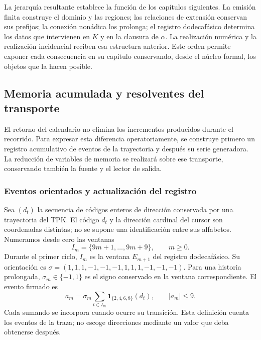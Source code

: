 La jerarquía resultante establece la función de los capítulos siguientes.
La emisión finita construye el dominio y las regiones; las relaciones de
extensión conservan sus prefijos; la conexión nonádica los prolonga; el
registro dodecafásico determina los datos que intervienen en \(K\) y
en la clausura de \(\alpha\). La realización numérica y la realización
incidencial reciben esa estructura anterior. Este orden permite exponer
cada consecuencia en su capítulo conservando, desde el núcleo formal,
los objetos que la hacen posible.




\subsection{Memoria acumulada y resolventes del transporte}
\label{x_reciprocidad:subsec:memoria-resolvente}

El retorno del calendario no elimina los incrementos producidos durante
el recorrido. Para expresar esta diferencia operatoriamente, se construye
primero un registro acumulativo de eventos de la trayectoria y después su
serie generadora. La reducción de variables de memoria se realizará sobre
ese transporte, conservando también la fuente y el lector de salida.

\subsubsection{Eventos orientados y actualización del registro}

Sea \((d_t)\) la secuencia de códigos enteros de dirección conservada
por una trayectoria del TPK. El código \(d_t\) y la dirección cardinal
del cursor son coordenadas distintas; no se supone una identificación
entre sus alfabetos. Numeramos desde cero las ventanas
\[
 I_m=\{9m+1,\ldots,9m+9\},\qquad m\geq0.
\]
Durante el primer ciclo, \(I_m\) es la ventana \(E_{m+1}\) del registro
dodecafásico. Su orientación es
\(\sigma=(1,1,1,-1,-1,-1,1,1,1,-1,-1,-1)\).
Para una historia prolongada, \(\sigma_m\in\{-1,1\}\) es el signo
conservado en la ventana correspondiente. El evento firmado es
\begin{equation}
 a_m=\sigma_m\sum_{t\in I_m}
       \mathbf1_{\{2,4,6,8\}}(d_t),\qquad |a_m|\leq9.
 \label{x_reciprocidad:mem:evento}
\end{equation}
Cada sumando se incorpora cuando ocurre su transición. Esta definición
cuenta los eventos de la traza; no escoge direcciones mediante un valor
que deba obtenerse después.

